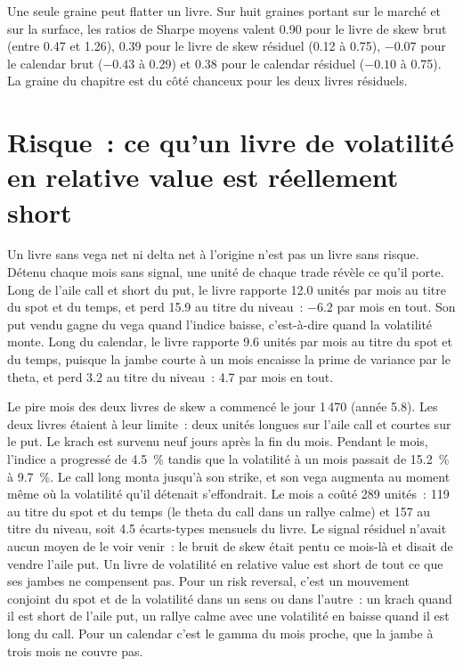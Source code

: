 Une seule graine peut flatter un livre. Sur huit graines portant sur le marché et sur la surface, les ratios de Sharpe moyens valent 0.90 pour le livre de skew brut (entre 0.47 et
1.26), 0.39 pour le livre de skew résiduel (0.12 à 0.75), $-0.07$ pour le calendar brut ($-0.43$ à 0.29) et 0.38 pour le calendar résiduel ($-0.10$ à
0.75). La graine du chapitre est du côté chanceux pour les deux livres résiduels.

\section{Risque~: ce qu'un livre de volatilité en relative value est réellement short}

Un livre sans vega net ni delta net à l'origine n'est pas un livre sans risque. Détenu chaque mois sans signal, une unité de chaque trade révèle
ce qu'il porte. Long de l'aile call et short du put, le livre rapporte 12.0 unités par mois au titre du spot et du temps, et perd 15.9 au titre du niveau~: $-6.2$ par mois en
tout. Son put vendu gagne du vega quand l'indice baisse, c'est-à-dire quand la volatilité monte. Long du calendar, le livre rapporte 9.6 unités par mois au titre du spot et du temps, puisque la jambe courte
à un mois encaisse la prime de variance par le theta, et perd 3.2 au titre du niveau~: 4.7 par mois en tout.

Le pire mois des deux livres de skew a commencé le jour 1\,470 (année 5.8). Les deux livres étaient à leur limite~: deux unités longues sur l'aile call et courtes sur le put. Le
krach est survenu neuf jours après la fin du mois. Pendant le mois, l'indice a progressé de 4.5~\% tandis que la volatilité à un mois passait de 15.2~\% à 9.7~\%. Le call long
monta jusqu'à son strike, et son vega augmenta au moment même où la volatilité qu'il détenait s'effondrait. Le mois a coûté 289 unités~: 119 au titre du spot et du temps (le theta du call dans un
rallye calme) et 157 au titre du niveau, soit 4.5 écarts-types mensuels du livre. Le signal résiduel n'avait aucun moyen de le voir venir~: le bruit de skew était
pentu ce mois-là et disait de vendre l'aile put. Un livre de volatilité en relative value est short de tout ce que ses jambes ne compensent pas. Pour un risk reversal, c'est un mouvement conjoint
du spot et de la volatilité dans un sens ou dans l'autre~: un krach quand il est short de l'aile put, un rallye calme avec une volatilité en baisse quand il est long du call. Pour un calendar
c'est le gamma du mois proche, que la jambe à trois mois ne couvre pas.

